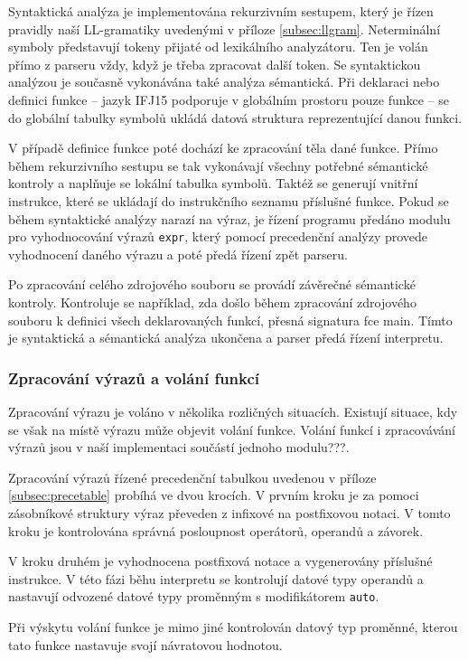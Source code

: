 \documentclass[a4paper, 12pt]{article}
\begin{document}
Syntaktická analýza je implementována rekurzivním sestupem, který je řízen
pravidly naší LL-gramatiky uvedenými v příloze \ref{subsec:llgram}. Neterminální symboly představují tokeny přijaté od
lexikálního analyzátoru. Ten je volán přímo z parseru vždy, když je třeba
zpracovat další token. Se syntaktickou analýzou je současně vykonávána také
analýza sémantická. Při deklaraci nebo definici funkce -- jazyk IFJ15 podporuje v
globálním prostoru pouze funkce -- se do globální tabulky symbolů ukládá datová
struktura reprezentující danou funkci.

V případě definice funkce poté dochází ke zpracování těla dané funkce.
Přímo během rekurzivního sestupu se tak vykonávají všechny potřebné
sémantické kontroly a naplňuje se lokální tabulka symbolů. Taktéž se generují
vnitřní instrukce, které se ukládají do instrukčního seznamu příslušné funkce.
Pokud se během syntaktické analýzy narazí na výraz, je řízení programu předáno
modulu pro vyhodnocování výrazů \texttt{expr}, který pomocí precedenční analýzy
provede vyhodnocení daného výrazu a poté předá řízení zpět parseru.

Po zpracování celého zdrojového souboru se provádí závěrečné sémantické
kontroly. Kontroluje se například, zda došlo během zpracování zdrojového
souboru k definici všech deklarovaných funkcí, přesná signatura fce main.
Tímto je syntaktická a sémantická analýza ukončena a parser předá řízení interpretu.

\subsubsection{Zpracování výrazů a volání funkcí}
Zpracování výrazu je voláno v několika rozličných situacích. Existují situace,
kdy se však na místě výrazu může objevit volání funkce. Volání funkcí i zpracovávání
výrazů jsou v naší implementaci součástí jednoho modulu???.

Zpracování výrazů řízené precedenční tabulkou uvedenou v příloze
\ref{subsec:precetable} probíhá ve dvou krocích. V prvním kroku je za pomoci
zásobníkové struktury výraz převeden z infixové
na postfixovou notaci. V tomto kroku je kontrolována správná posloupnost
operátorů, operandů a závorek.

V kroku druhém je vyhodnocena postfixová notace a vygenerovány příslušné instrukce.
V této fázi běhu interpretu se kontrolují datové typy operandů a nastavují
odvozené datové typy proměnným s modifikátorem \texttt{auto}.

Při výskytu volání funkce je mimo jiné kontrolován datový typ proměnné,
kterou tato funkce nastavuje svojí návratovou hodnotou.
\end{document}
